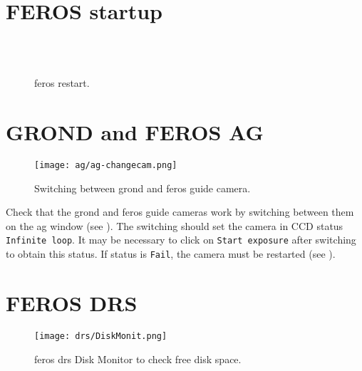 \documentclass[11pt,fleqn,a4paper]{book}
\begin{document}
\section{FEROS startup}

\begin{figure}[b!]
\null\hfill
{}\hfill
{}\hfill\null\\
\null\hfill
{}\hfill
{}\hfill\null\\
\null\hfill
{}\hfill
{}\hfill\null
\caption[FEROS restart]{\gls{feros} restart.}
\label{fig:feros-restart}
\end{figure}

\newpage
\section{GROND and FEROS AG}
\begin{figure}[ht!]
\centering
\texttt{[image: ag/ag-changecam.png]}
\caption[Switching between GROND and FEROS guide cameras]{Switching between \gls{grond} and \gls{feros} guide camera.}
\label{fig:agswitch}
\end{figure}
Check that the \gls{grond} and \gls{feros} guide cameras work by
switching between them on the \gls{ag} window (see ).
The switching should set the camera in CCD status \texttt{Infinite loop}.  It 
may be necessary to click on \texttt{Start exposure} after switching to
obtain this status.  If status is \texttt{Fail}, the camera must be restarted (see  ).

\section{FEROS DRS}
\begin{figure}[ht!]
\centering
\texttt{[image: drs/DiskMonit.png]}
\caption[FEROS DRS Disk Monitor]{\gls{feros} \gls{drs} Disk Monitor to check free disk space.}
\label{fig:diskmonit}
\end{figure}
\end{document}
